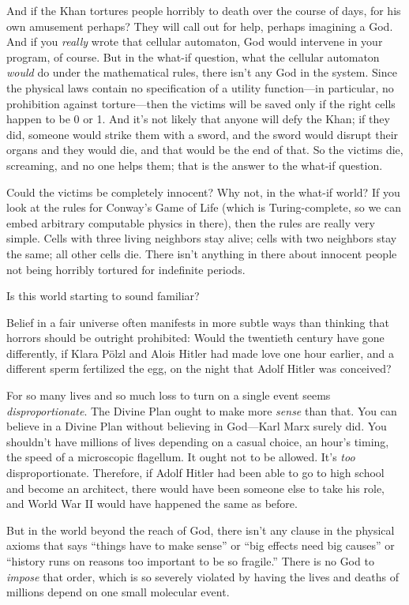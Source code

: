 {
 And if the Khan tortures people horribly to death over the course
of days, for his own amusement perhaps? They will call out for help,
perhaps imagining a God. And if you \textit{really} wrote that cellular
automaton, God would intervene in your program, of course. But in the
what-if question, what the cellular automaton \textit{would} do under
the mathematical rules, there isn't any God in the
system. Since the physical laws contain no specification of a utility
function---in particular, no prohibition against torture---then the
victims will be saved only if the right cells happen to be 0 or 1. And
it's not likely that anyone will defy the Khan; if they
did, someone would strike them with a sword, and the sword would
disrupt their organs and they would die, and that would be the end of
that. So the victims die, screaming, and no one helps them; that is the
answer to the what-if question.}

{
 Could the victims be completely innocent? Why not, in the what-if
world? If you look at the rules for Conway's Game of
Life (which is Turing-complete, so we can embed arbitrary computable
physics in there), then the rules are really very simple. Cells with
three living neighbors stay alive; cells with two neighbors stay the
same; all other cells die. There isn't anything in
there about innocent people not being horribly tortured for indefinite
periods.}

{
 Is this world starting to sound familiar?}

{
 Belief in a fair universe often manifests in more subtle ways than
thinking that horrors should be outright prohibited: Would the
twentieth century have gone differently, if Klara Pölzl and Alois
Hitler had made love one hour earlier, and a different sperm fertilized
the egg, on the night that Adolf Hitler was conceived?}

{
 For so many lives and so much loss to turn on a single event seems
\textit{disproportionate}. The Divine Plan ought to make more
\textit{sense} than that. You can believe in a Divine Plan without
believing in God---Karl Marx surely did. You shouldn't
have millions of lives depending on a casual choice, an
hour's timing, the speed of a microscopic flagellum. It
ought not to be allowed. It's \textit{too}
disproportionate. Therefore, if Adolf Hitler had been able to go to
high school and become an architect, there would have been someone else
to take his role, and World War II would have happened the same as
before.}

{
 But in the world beyond the reach of God, there
isn't any clause in the physical axioms that says
``things have to make sense'' or
``big effects need big causes'' or
``history runs on reasons too important to be so
fragile.'' There is no God to \textit{impose} that
order, which is so severely violated by having the lives and deaths of
millions depend on one small molecular event.}

